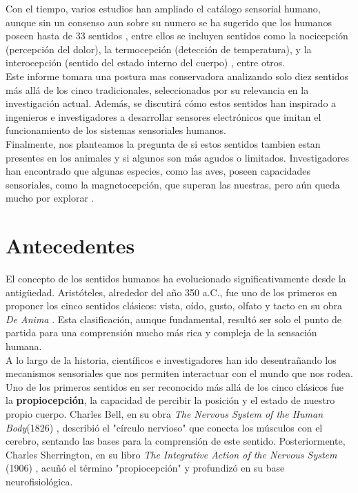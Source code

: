 \documentclass[conference]{IEEEtran}
\begin{document}
Con el tiempo, varios estudios han ampliado el catálogo sensorial humano, aunque sin un consenso aun sobre su numero se ha sugerido que los humanos poseen hasta de 33 sentidos \cite{AHRC2017}, entre ellos se incluyen sentidos como la nocicepción (percepción del dolor)\cite{melzack1965}, la termocepción (detección de temperatura)\cite{hensel1973}, y la interocepción (sentido del estado interno del cuerpo) \cite{craig2002}, entre otros.\\

Este informe tomara una postura mas conservadora analizando solo diez sentidos más allá de los cinco tradicionales, seleccionados por su relevancia en la investigación actual. Además, se discutirá cómo estos sentidos han inspirado a ingenieros e investigadores a desarrollar sensores electrónicos que imitan el funcionamiento de los sistemas sensoriales humanos.\\

Finalmente, nos planteamos la pregunta de si estos sentidos tambien estan presentes en los animales y si algunos son más agudos o limitados. Investigadores han encontrado que algunas especies, como las aves, poseen capacidades sensoriales, como la magnetocepción, que superan las nuestras, pero aún queda mucho por explorar \cite{wiltschko1972}. \\


\bigskip
\section{Antecedentes}

El concepto de los sentidos humanos ha evolucionado significativamente desde la antigüedad. Aristóteles, alrededor del año 350 a.C., fue uno de los primeros en proponer los cinco sentidos clásicos: vista, oído, gusto, olfato y tacto en su obra \textit{De Anima} \cite{Brandt2024}.  Esta clasificación, aunque fundamental,  resultó ser solo el punto de partida para una comprensión mucho más rica y compleja de la sensación humana.\\

A lo largo de la historia,  científicos e investigadores han ido desentrañando los mecanismos sensoriales que nos permiten interactuar con el mundo que nos rodea.  Uno de los primeros sentidos en ser reconocido más allá de los cinco clásicos fue la \textbf{propiocepción}, la capacidad de percibir la posición y el estado de nuestro propio cuerpo.  Charles Bell, en su obra \textit{The Nervous System of the Human Body}(1826) \cite{bell1826nervous},  describió el "círculo nervioso" que conecta los músculos con el cerebro, sentando las bases para la comprensión de este sentido.  Posteriormente, Charles Sherrington, en su libro \textit{The Integrative Action of the Nervous System} (1906) \cite{sherrington1906integrative}, acuñó el término "propiocepción" y profundizó en su base neurofisiológica.\\
\end{document}
